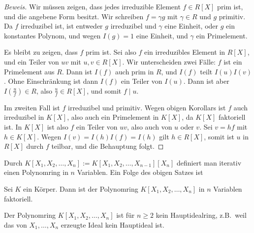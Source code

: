 \documentclass[12pt,a4paper,twoside]{article}
\begin{document}
\begin{proof}[Beweis]
  Wir m\"ussen zeigen, dass jedes irreduzible Element $f\in R[X]$ prim ist,
  und die angebene Form besitzt. Wir schreiben $f=\gamma g$ mit $\gamma\in R$
  und $g$ primitiv. Da $f$ irreduzibel ist, ist entweder $g$ irreduzibel und
  $\gamma$ eine Einheit, oder $g$ ein konstantes Polynom, und wegen $I(g)=1$
  eine Einheit, und $\gamma$ ein Primelement.
  
  Es bleibt zu zeigen, dass $f$ prim ist. Sei also $f$ ein irreduzibles
  Element in $R[X]$, und ein Teiler von $uv$ mit $u,v\in R[X]$. Wir
  unterscheiden zwei F\"alle: $f$ ist ein Primelement aus $R$. Dann ist $I(f)$
  auch prim in $R$, und $I(f)$ teilt $I(u)I(v)$. Ohne Einschr\"ankung ist dann
  $I(f)$ ein Teiler von $I(u)$. Dann ist aber $I(\frac{u}{f})\in R$, also
  $\frac{u}{f}\in R[X]$, und somit $f\mid u$.
  
  Im zweiten Fall ist $f$ irreduzibel und primitiv. Wegen obigen Korollars ist
  $f$ auch irreduzibel in $K[X]$, also auch ein Primelement in $K[X]$, da
  $K[X]$ faktoriell ist. In $K[X]$ ist also $f$ ein Teiler von $uv$, also auch
  von $u$ oder $v$. Sei $v=hf$ mit $h\in K[X]$. Wegen $I(v)=I(h)I(f)=I(h)$
  gilt $h\in R[X]$, somit ist $u$ in $R[X]$ durch $f$ teilbar, und die
  Behauptung folgt.
\end{proof}
Durch $K[X_1,X_2,\dots,X_n]:=K[X_1,X_2,\dots,X_{n-1}][X_n]$ definiert man
iterativ einen Polynomring in $n$ Variablen. Ein Folge des obigen Satzes ist
\begin{Korollar}
  Sei $K$ ein K\"orper. Dann ist der Polynomring $K[X_1,X_2,\dots,X_n]$ in $n$
  Variablen faktoriell.
\end{Korollar}
\begin{Bemerkung*}
  Der Polynomring $K[X_1,X_2,\dots,X_n]$ ist f\"ur $n\ge2$ kein
  Hauptidealring, z.B.\ weil das von $X_1,\dots,X_n$ erzeugte Ideal kein
  Hauptideal ist.
\end{Bemerkung*}
\end{document}
